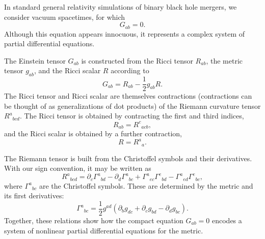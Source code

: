In standard general relativity simulations of binary black hole mergers, we consider vacuum spacetimes, for which
\begin{equation}
G_{ab} = 0.
\end{equation}
Although this equation appears innocuous, it represents a complex system of partial differential equations. 

The Einstein tensor $G_{ab}$ is constructed from the Ricci tensor $R_{ab}$, the metric tensor $g_{ab}$, and the Ricci scalar $R$ according to
\begin{equation}
G_{ab} = R_{ab} - \frac{1}{2} g_{ab} R.
\end{equation}
The Ricci tensor and Ricci scalar are themselves contractions (contractions can be thought of as generalizations of dot products) of the Riemann curvature tensor $R^{a}{}_{bcd}$. The Ricci tensor is obtained by contracting the first and third indices,
\begin{equation}
R _{ab} = R^{c}{}_{acb},
\end{equation}
and the Ricci scalar is obtained by a further contraction,
\begin{equation}
R = R^{a}{}_{a}.
\end{equation}

The Riemann tensor is built from the Christoffel symbols and their derivatives. With our sign convention, it may be written as
\begin{equation}
R^{a}{}_{bcd}
=
\partial_c \Gamma^{a}{}_{bd}
- \partial_d \Gamma^{a}{}_{bc}
+ \Gamma^{a}{}_{ec}\Gamma^{e}{}_{bd}
- \Gamma^{a}{}_{ed}\Gamma^{e}{}_{bc},
\end{equation}
where $\Gamma^{a}{}_{bc}$ are the Christoffel symbols. These are determined by the metric and its first derivatives:
\begin{equation}
\Gamma^{a}{}_{bc}
=
\frac{1}{2} g^{ad}
\left(
\partial_b g_{dc}
+ \partial_c g_{bd}
- \partial_d g_{bc}
\right).
\end{equation}
Together, these relations show how the compact equation $G_{ab}=0$ encodes a system of nonlinear partial differential equations for the metric.

